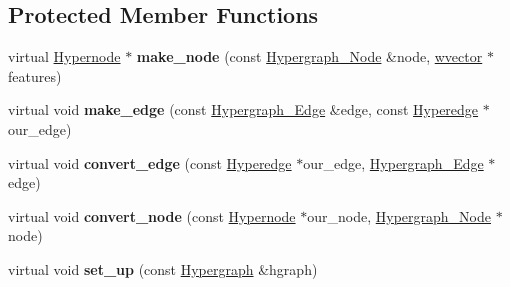\subsection*{Protected Member Functions}
\begin{DoxyCompactItemize}
\item 
\hypertarget{classScarab_1_1HG_1_1HypergraphImpl_af14198ba5fccb5d4118188fa42feb8ff}{
virtual \hyperlink{classScarab_1_1HG_1_1Hypernode}{Hypernode} $\ast$ {\bfseries make\_\-node} (const \hyperlink{classHypergraph__Node}{Hypergraph\_\-Node} \&node, \hyperlink{classsvector}{wvector} $\ast$features)}
\label{classScarab_1_1HG_1_1HypergraphImpl_af14198ba5fccb5d4118188fa42feb8ff}

\item 
\hypertarget{classScarab_1_1HG_1_1HypergraphImpl_a238a7ce3b578c8126eccbc7803570638}{
virtual void {\bfseries make\_\-edge} (const \hyperlink{classHypergraph__Edge}{Hypergraph\_\-Edge} \&edge, const \hyperlink{classScarab_1_1HG_1_1Hyperedge}{Hyperedge} $\ast$our\_\-edge)}
\label{classScarab_1_1HG_1_1HypergraphImpl_a238a7ce3b578c8126eccbc7803570638}

\item 
\hypertarget{classScarab_1_1HG_1_1HypergraphImpl_a30349aca0e3b8f8dc72ed74d78e8c5b8}{
virtual void {\bfseries convert\_\-edge} (const \hyperlink{classScarab_1_1HG_1_1Hyperedge}{Hyperedge} $\ast$our\_\-edge, \hyperlink{classHypergraph__Edge}{Hypergraph\_\-Edge} $\ast$edge)}
\label{classScarab_1_1HG_1_1HypergraphImpl_a30349aca0e3b8f8dc72ed74d78e8c5b8}

\item 
\hypertarget{classScarab_1_1HG_1_1HypergraphImpl_a93e9e250fa457a2171bf07241b7829eb}{
virtual void {\bfseries convert\_\-node} (const \hyperlink{classScarab_1_1HG_1_1Hypernode}{Hypernode} $\ast$our\_\-node, \hyperlink{classHypergraph__Node}{Hypergraph\_\-Node} $\ast$node)}
\label{classScarab_1_1HG_1_1HypergraphImpl_a93e9e250fa457a2171bf07241b7829eb}

\item 
\hypertarget{classScarab_1_1HG_1_1HypergraphImpl_ae91de73e633e450b01664e3ec964019c}{
virtual void {\bfseries set\_\-up} (const \hyperlink{classHypergraph}{Hypergraph} \&hgraph)}
\label{classScarab_1_1HG_1_1HypergraphImpl_ae91de73e633e450b01664e3ec964019c}

\end{DoxyCompactItemize}
